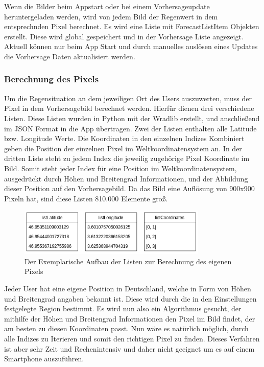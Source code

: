 Wenn die Bilder beim Appstart oder bei einem Vorhersageupdate heruntergeladen werden, wird von jedem Bild der Regenwert 
in dem entsprechnden Pixel berechnet. 
Es wird eine Liste mit ForecastListItem Objekten erstellt. Diese wird global gespeichert und in der Vorhersage Liste angezeigt. 
Aktuell können nur beim App Start und durch manuelles auslösen eines Updates die Vorhersage Daten aktualisiert werden.   

\subsubsection{Berechnung des Pixels} \label{sec: pixel_berechnung}
Um die Regensituation an dem jeweiligen Ort des Users auszuwerten, muss der Pixel in dem Vorhersagebild berechnet werden. 
Hierfür dienen drei verschiedene Listen. Diese Listen wurden in Python mit der Wradlib erstellt, und anschließend 
im JSON Format in die App übertragen. 
Zwei der Listen enthalten alle Latitude bzw. Longitude Werte.
Die Koordinaten in den einzelnen Indizes Kombiniert geben die Position der einzelnen Pixel im Weltkoordinatensystem an.
In der dritten Liste steht zu jedem Index die jeweilig zugehörige Pixel Koordinate im Bild. 
Somit steht jeder Index für eine Position im Weltkoordinatensystem, ausgedrückt durch Höhen und Breitengrad Informationen, 
und der Abbildung dieser Position auf den Vorhersagebild.
Da das Bild eine Auflösung von 900x900 Pixeln hat, sind diese Listen 810.000 Elemente groß. 
\begin{figure}[H]
  \centering
  \includegraphics[width=0.8\textwidth,angle=0]{abb/listen_pixel_berechnung.png}
  \caption{Der Exemplarische Aufbau der Listen zur Berechnung des eigenen Pixels}
 \label{fig:sequence_diagram_app_start}
 \end{figure}
 Jeder User hat eine eigene Position in Deutschland, welche in Form von Höhen und Breitengrad angaben bekannt ist. 
 Diese wird durch die in den Einstellungen festgelegte Region bestimmt. 
 Es wird nun also ein Algorithmus gesucht, der mithilfe der Höhen und Breitengrad Informationen den Pixel im Bild findet, 
 der am besten zu diesen Koordinaten passt. 
 Nun wäre es natürlich möglich, durch alle Indizes zu Iterieren und somit den richtigen Pixel zu finden. Dieses Verfahren 
 ist aber sehr Zeit und Rechenintensiv und daher nicht geeignet um  es auf einem Smartphone auszuführen. 

